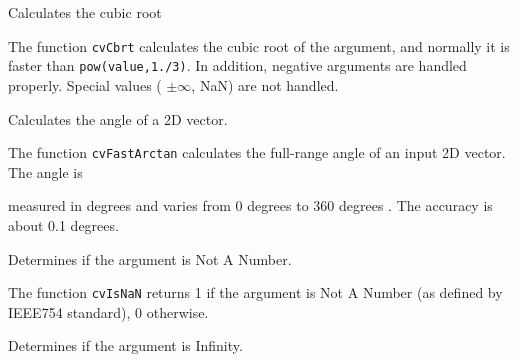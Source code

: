 \label{Cbrt}

Calculates the cubic root


\begin{description}
\end{description}


The function \texttt{cvCbrt} calculates the cubic root of the argument, and normally it is faster than \texttt{pow(value,1./3)}. In addition, negative arguments are handled properly. Special values ( $ \pm \infty $, NaN) are not handled.

\label{FastArctan}

Calculates the angle of a 2D vector.


\begin{description}
\end{description}


The function \texttt{cvFastArctan} calculates the full-range angle of an input 2D vector. The angle is 

measured in degrees and varies from 0 degrees to 360 degrees . The accuracy is about 0.1 degrees.

\label{IsNaN}

Determines if the argument is Not A Number.


\begin{description}
\end{description}


The function \texttt{cvIsNaN} returns 1 if the argument is Not A Number (as defined by IEEE754 standard), 0 otherwise.


\label{IsInf}

Determines if the argument is Infinity.


